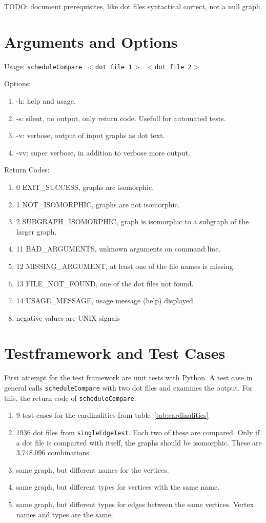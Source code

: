\documentclass[12pt,a4paper]{report}
\begin{document}
TODO: document prerequisites, like dot files syntactical correct, not a null graph.
\chapter{Arguments and Options}
Usage: \texttt{scheduleCompare $<$dot file 1$>$ $<$dot file 2$>$}

Options:
\begin{enumerate}
	\item -h: help and usage.
	\item -s: silent, no output, only return code. Usefull for automated tests.
	\item -v: verbose, output of input graphs as dot text.
	\item -vv: super verbose, in addition to verbose more output.
\end{enumerate}

Return Codes:
\begin{enumerate}
	\item 0 EXIT_SUCCESS, graphs are isomorphic.
	\item 1 NOT_ISOMORPHIC, graphs are not isomorphic.
	\item 2 SUBGRAPH_ISOMORPHIC, graph is isomorphic to a subgraph of the larger graph.
	\item 11 BAD_ARGUMENTS, unknown arguments on command line.
	\item 12 MISSING_ARGUMENT, at least one of the file names is missing.
	\item 13 FILE_NOT_FOUND, one of the dot files not found.
	\item 14 USAGE_MESSAGE, usage message (help) displayed.
	\item negative values are UNIX signals
\end{enumerate}

\chapter{Testframework and Test Cases}
First attempt for the test framework are unit tests with Python. A test case in general calls \texttt{scheduleCompare} with two dot files and examines the output. For this, the return code of \texttt{scheduleCompare}.

\begin{enumerate}
	\item 9 test cases for the cardinalities from table~\ref{tab:cardinalities}
	\item 1936 dot files from \texttt{singleEdgeTest}. Each two of these are compared. Only if a dot file is comparted with itself, the graphs should be isomorphic. These are 3.748.096 combinations.
	\item same graph, but different names for the vertices.
	\item same graph, but different types for vertices with the same name.
	\item same graph, but different types for edges between the same vertices. Vertex names and types are the same.
\end{enumerate}
\end{document}
